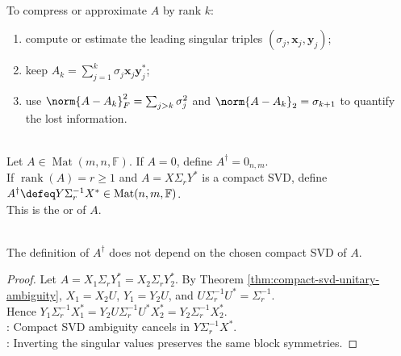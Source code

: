 \begin{method} \label{meth:truncated-svd-approximation} \\
To compress or approximate $A$ by rank $k$:
\begin{enumerate}[label=(\roman*)]
\setlength{\itemsep}{0pt}
\item compute or estimate the leading singular triples $(\sigma_j,\mathbf{x}_j,\mathbf{y}_j)$;
\item keep $A_k=\sum_{j=1}^{k}\sigma_j\mathbf{x}_j\mathbf{y}_j^*$;
\item use $\norm{A-A_k}_F^2=\sum_{j>k}\sigma_j^2$ and $\norm{A-A_k}_2=\sigma_{k+1}$ to quantify the lost information.
\end{enumerate}
\end{method}

\begin{definition} \label{def:moore-penrose-pseudoinverse} \\
Let $A\in\operatorname{Mat}(m,n,\mathbb{F})$. If $A=0$, define $A^{\dagger}=0_{n,m}$.\\
If $\operatorname{rank}(A)=r\geq1$ and $A=X\Sigma_rY^*$ is a compact SVD, define $A^{\dagger}\defeq Y\Sigma_r^{-1}X^*\in\operatorname{Mat}(n,m,\mathbb{F})$.\\
This is the  or  of $A$.
\end{definition}

\begin{proposition} \label{prop:pseudoinverse-well-defined} \\
The definition of $A^{\dagger}$ does not depend on the chosen compact SVD of $A$.
\begin{proof}
Let $A=X_1\Sigma_rY_1^*=X_2\Sigma_rY_2^*$. By Theorem \ref{thm:compact-svd-unitary-ambiguity}, $X_1=X_2U$, $Y_1=Y_2U$, and $U\Sigma_r^{-1}U^*=\Sigma_r^{-1}$.\\
Hence $Y_1\Sigma_r^{-1}X_1^* =Y_2U\Sigma_r^{-1}U^*X_2^* =Y_2\Sigma_r^{-1}X_2^*$.\\
: Compact SVD ambiguity cancels in $Y\Sigma_r^{-1}X^*$.\\
: Inverting the singular values preserves the same block symmetries.
\end{proof}
\end{proposition}

